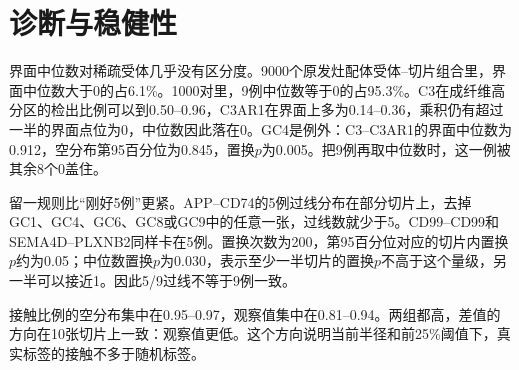 \section{诊断与稳健性}
\label{sec:diagnostics}

界面中位数对稀疏受体几乎没有区分度。9000个原发灶配体受体--切片组合里，界面中位数大于0的占6.1\%。1000对里，9例中位数等于0的占95.3\%。C3在成纤维高分区的检出比例可以到0.50--0.96，C3AR1在界面上多为0.14--0.36，乘积仍有超过一半的界面点位为0，中位数因此落在0。GC4是例外：C3--C3AR1的界面中位数为0.912，空分布第95百分位为0.845，置换$p$为0.005。把9例再取中位数时，这一例被其余8个0盖住。

留一规则比“刚好5例”更紧。APP--CD74的5例过线分布在部分切片上，去掉GC1、GC4、GC6、GC8或GC9中的任意一张，过线数就少于5。CD99--CD99和SEMA4D--PLXNB2同样卡在5例。置换次数为200，第95百分位对应的切片内置换$p$约为0.05；中位数置换$p$为0.030，表示至少一半切片的置换$p$不高于这个量级，另一半可以接近1。因此5/9过线不等于9例一致。

接触比例的空分布集中在0.95--0.97，观察值集中在0.81--0.94。两组都高，差值的方向在10张切片上一致：观察值更低。这个方向说明当前半径和前25\%阈值下，真实标签的接触不多于随机标签。
